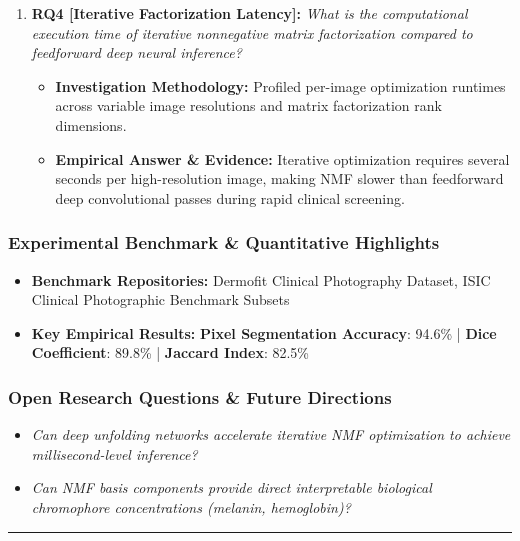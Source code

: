 \begin{enumerate}[label=\textbf{\arabic*.}, leftmargin=*]
\begin{itemize}[leftmargin=1.5em]
    \item \textbf{Empirical Answer \& Evidence:} Mutual Information effectively captured non-linear statistical dependencies between lesion pigments and surrounding skin, preventing boundary leakage.
  \end{itemize}
  \item \textbf{RQ4 [Iterative Factorization Latency]:} \textit{What is the computational execution time of iterative nonnegative matrix factorization compared to feedforward deep neural inference?}
  \begin{itemize}[leftmargin=1.5em]
    \item \textbf{Investigation Methodology:} Profiled per-image optimization runtimes across variable image resolutions and matrix factorization rank dimensions.
    \item \textbf{Empirical Answer \& Evidence:} Iterative optimization requires several seconds per high-resolution image, making NMF slower than feedforward deep convolutional passes during rapid clinical screening.
  \end{itemize}
\end{enumerate}

\subsubsection*{Experimental Benchmark \& Quantitative Highlights}
\begin{itemize}[leftmargin=*]
  \item \textbf{Benchmark Repositories:} Dermofit Clinical Photography Dataset, ISIC Clinical Photographic Benchmark Subsets
  \item \textbf{Key Empirical Results:} \textbf{Pixel Segmentation Accuracy}: 94.6\% \quad | \quad \textbf{Dice Coefficient}: 89.8\% \quad | \quad \textbf{Jaccard Index}: 82.5\%
\end{itemize}

\subsubsection*{Open Research Questions \& Future Directions}
\begin{itemize}[leftmargin=*]
  \item \textit{Can deep unfolding networks accelerate iterative NMF optimization to achieve millisecond-level inference?}
  \item \textit{Can NMF basis components provide direct interpretable biological chromophore concentrations (melanin, hemoglobin)?}
\end{itemize}
\vspace{0.8em}\hrule\vspace{1.2em}
